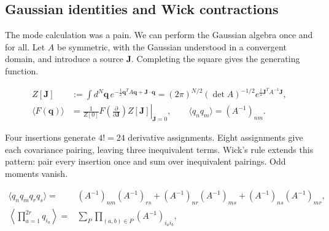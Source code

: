 \subsection{Gaussian identities and Wick contractions}

The mode calculation was a pain. We can perform the Gaussian algebra once and for all. Let $A$ be symmetric, with the Gaussian understood in a convergent domain, and introduce a source $\mathbf J$. Completing the square gives the generating function.

\begin{align}
  Z[\mathbf J]
  &:=\int d^N\mathbf q\,
  e^{-\frac12\mathbf q^TA\mathbf q+\mathbf J\cdot\mathbf q}
  =(2\pi)^{N/2}(\det A)^{-1/2}
  e^{\frac12\mathbf J^TA^{-1}\mathbf J},
  \label{eq:253a-ch02-finite-gaussian}\\
  \langle F(\mathbf q)\rangle
  &=\left.\frac1{Z[0]}F\!\left(\frac{\partial}{\partial\mathbf J}\right)
  Z[\mathbf J]\right|_{\mathbf J=0},
  \qquad
  \langle q_nq_m\rangle=(A^{-1})_{nm}.
  \label{eq:253a-ch02-gaussian-source-derivatives}
\end{align}

Four insertions generate $4!=24$ derivative assignments. Eight assignments give each covariance pairing, leaving three inequivalent terms. Wick's rule extends this pattern: pair every insertion once and sum over inequivalent pairings. Odd moments vanish.

\begin{align}
  \langle q_nq_mq_rq_s\rangle
  ={}&(A^{-1})_{nm}(A^{-1})_{rs}
  +(A^{-1})_{nr}(A^{-1})_{ms}
  +(A^{-1})_{ns}(A^{-1})_{mr},
  \label{eq:253a-ch02-four-point-gaussian}\\
  \left\langle\prod_{a=1}^{2r}q_{i_a}\right\rangle
  ={}&\sum_{P}\prod_{(a,b)\in P}(A^{-1})_{i_ai_b},
  \label{eq:253a-ch02-wick-rule}
\end{align}

